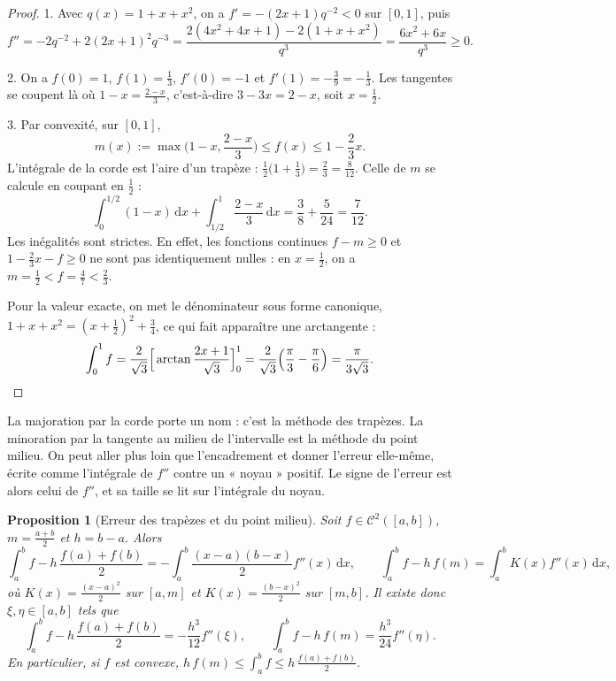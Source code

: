 \documentclass[11pt,a4paper]{article}
\theoremstyle{plain}
\newtheorem{proposition}[theoreme]{Proposition}
\theoremstyle{definition}
\theoremstyle{remark}
\newcommand{\dd}{\,\mathrm{d}}
\begin{document}
\begin{proof}
1. Avec $q(x)=1+x+x^2$, on a $f'=-(2x+1)q^{-2}<0$ sur $[0,1]$, puis
\[
  f''=-2q^{-2}+2(2x+1)^2q^{-3}=\frac{2(4x^2+4x+1)-2(1+x+x^2)}{q^3}=\frac{6x^2+6x}{q^3}\geq0 .
\]

2. On a $f(0)=1$, $f(1)=\frac13$, $f'(0)=-1$ et $f'(1)=-\frac39=-\frac13$. Les tangentes se coupent là où $1-x=\frac{2-x}{3}$, c'est-à-dire $3-3x=2-x$, soit $x=\frac12$.

3. Par convexité, sur $[0,1]$,
\[
  m(x):=\max\Big(1-x,\frac{2-x}3\Big)\leq f(x)\leq1-\frac23x .
\]
L'intégrale de la corde est l'aire d'un trapèze : $\frac12\big(1+\frac13\big)=\frac23=\frac8{12}$. Celle de $m$ se calcule en coupant en $\frac12$ :
\[
  \int_0^{1/2}(1-x)\dd x+\int_{1/2}^1\frac{2-x}3\dd x=\frac38+\frac5{24}=\frac7{12}.
\]
Les inégalités sont strictes. En effet, les fonctions continues $f-m\geq 0$ et $1-\frac23x-f\geq 0$ ne sont pas identiquement nulles : en $x=\frac12$, on a $m=\frac12<f=\frac47<\frac23$.

Pour la valeur exacte, on met le dénominateur sous forme canonique, $1+x+x^2=(x+\frac12)^2+\frac34$, ce qui fait apparaître une arctangente :
\[
  \int_0^1f=\frac2{\sqrt3}\Big[\arctan\frac{2x+1}{\sqrt3}\Big]_0^1=\frac2{\sqrt3}\Big(\frac\pi3-\frac\pi6\Big)=\frac\pi{3\sqrt3}. \qedhere
\]
\end{proof}

La majoration par la corde porte un nom : c'est la méthode des trapèzes. La minoration par la tangente au milieu de l'intervalle est la méthode du point milieu. On peut aller plus loin que l'encadrement et donner l'erreur elle-même, écrite comme l'intégrale de $f''$ contre un « noyau » positif. Le signe de l'erreur est alors celui de $f''$, et sa taille se lit sur l'intégrale du noyau.

\begin{proposition}[Erreur des trapèzes et du point milieu]\label{prop:quadrature}
Soit $f\in\mathcal C^2([a,b])$, $m=\frac{a+b}2$ et $h=b-a$. Alors
\[
  \int_a^bf-h\,\frac{f(a)+f(b)}2=-\int_a^b\frac{(x-a)(b-x)}2f''(x)\dd x,\qquad
  \int_a^bf-h\,f(m)=\int_a^bK(x)f''(x)\dd x,
\]
où $K(x)=\frac{(x-a)^2}2$ sur $[a,m]$ et $K(x)=\frac{(b-x)^2}2$ sur $[m,b]$. Il existe donc $\xi,\eta\in[a,b]$ tels que
\[
  \int_a^bf-h\,\frac{f(a)+f(b)}2=-\frac{h^3}{12}f''(\xi),\qquad\int_a^bf-h\,f(m)=\frac{h^3}{24}f''(\eta).
\]
En particulier, si $f$ est convexe, $h\,f(m)\leq\int_a^bf\leq h\,\frac{f(a)+f(b)}2$.
\end{proposition}
\end{document}
